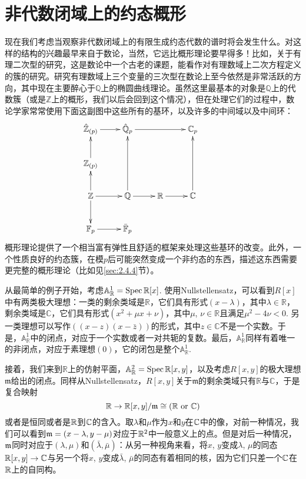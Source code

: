 \section{非代数闭域上的约态概形}

现在我们考虑当观察非代数闭域上的有限生成约态代数的谱时将会发生什么。对这样的结构的兴趣最早来自于数论，当然，它远比概形理论要早得多！比如，关于有理二次型的研究，这是数论中一个古老的课题，能看作对有理数域上二次方程定义的簇的研究。研究有理数域上三个变量的三次型在数论上至今依然是非常活跃的方向，其中现在主要醉心于$\mathbb{Q}$上的椭圆曲线理论。虽然这里最基本的对象是$\mathbb{Q}$上的代数簇（或是$\mathbb{Z}$上的概形，我们以后会回到这个情况），但在处理它们的过程中，数论学家常常使用下面这副图中这些所有的基环，以及许多的中间域以及中间环：
\[
\begin{xy}
	\xymatrix{
		\hat{\mathbb{Z}}_{(p)}\ar[r]&\hat{\mathbb{Q}}_{p}\ar[rr]&&\mathbb{C}_p\\
		\mathbb{Z}_{(p)}\ar[u]&&&\\
		\mathbb{Z}\ar[u]\ar[r]\ar[d]&\mathbb{Q}\ar[r]\ar[uu]&\mathbb{R}\ar[r]&\mathbb{C}\ar[uu]\\
		\mathbb{F}_p\ar[r]&\bar{\mathbb{F}}_p&&&
	}
\end{xy}
\]
概形理论提供了一个相当富有弹性且舒适的框架来处理这些基环的改变。此外，一个性质良好的约态簇，在模$p$后可能突然变成一个非约态的东西，描述这东西需要更完整的概形理论（比如见\ref{sec:2.4.4}节）。

从最简单的例子开始，考虑$\mathbb{A}_{\mathbb{R}}^1=\operatorname{Spec} \mathbb{R}[x]$. 使用Nullstellensatz，可以看到$R[x]$中有两类极大理想：一类的剩余类域是$\mathbb{R}$，它们具有形式$(x-\lambda)$，其中$\lambda\in\mathbb{R}$，剩余类域是$\mathbb{C}$，它们具有形式$(x^2+\mu x+\nu)$，其中$\mu$, $\nu\in\mathbb{R}$且满足$\mu^2-4\nu<0$. 另一类理想可以写作$((x-z)(x-\bar{z}))$的形式，其中$z\in \mathbb{C}$不是一个实数。于是，$\mathbb{A}_{\mathbb{R}}^1$中的闭点，对应于一个实数或者一对共轭的复数。最后，$\mathbb{A}_{\mathbb{R}}^1$同样有着唯一的非闭点，对应于素理想$(0)$，它的闭包是整个$\mathbb{A}_{\mathbb{R}}^1$.

接着，我们来到$\mathbb{R}$上的仿射平面，$\mathbb{A}_{\mathbb{R}}^2=\operatorname{Spec} \mathbb{R}[x,y]$，以及考虑$R[x,y]$的极大理想$\mathfrak{m}$给出的闭点。同样从Nullstellensatz，$R[x,y]$关于$\mathfrak{m}$的剩余类域只有$\mathbb{R}$与$\mathbb{C}$，于是复合映射
\[
	\mathbb{R}\to \mathbb{R}[x,y]/\mathfrak{m}\cong (\mathbb{R} \text{ or } \mathbb{C})
\]
或者是恒同或者是$\mathbb{R}$到$\mathbb{C}$的含入。取$\lambda$和$\mu$作为$x$和$y$在$\mathbb{C}$中的像，对前一种情况，我们可以看到$\mathfrak{m}=(x-\lambda,y-\mu)$对应于$\mathbb{R}^2$中一般意义上的点。但是对后一种情况，$\mathfrak{m}$同时对应于$(\lambda,\mu)$和$(\bar\lambda,\bar\mu)$：从另一种视角来看，将$x$, $y$变成$\lambda$, $\mu$的同态$\mathbb{R}[x,y]\to \mathbb{C}$与另一个将$x$, $y$变成$\bar\lambda$, $\bar\mu$的同态有着相同的核，因为它们只差一个$\mathbb{C}$在$\mathbb{R}$上的自同构。

